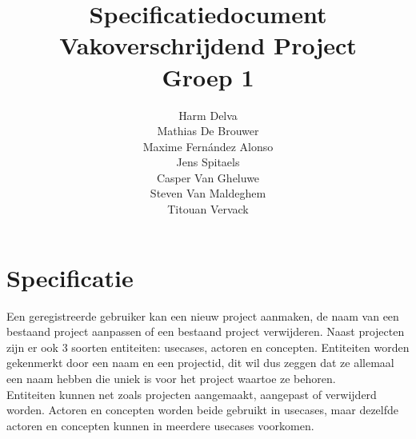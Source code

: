 \documentclass[a4paper,11pt]{article}
\begin{document}

\title{Specificatiedocument\\Vakoverschrijdend Project\\Groep 1}
\author{Harm Delva\\ Mathias De Brouwer\\ Maxime Fern\'andez Alonso\\ Jens Spitaels\\ Casper Van Gheluwe\\ Steven Van Maldeghem\\ Titouan Vervack}
\date{}
\maketitle


\section*{Specificatie}
Een geregistreerde gebruiker kan een nieuw project aanmaken, de naam van een bestaand project aanpassen of een bestaand project verwijderen. Naast projecten zijn er ook 3 soorten entiteiten: usecases, actoren en concepten. Entiteiten worden gekenmerkt door een naam en een projectid, dit wil dus zeggen dat ze allemaal een naam hebben die uniek is voor het project waartoe ze behoren.\\

\noindent Entiteiten kunnen net zoals projecten aangemaakt, aangepast of verwijderd worden. Actoren en concepten worden beide gebruikt in usecases, maar dezelfde actoren en concepten kunnen in meerdere usecases voorkomen. 
\end{document}
